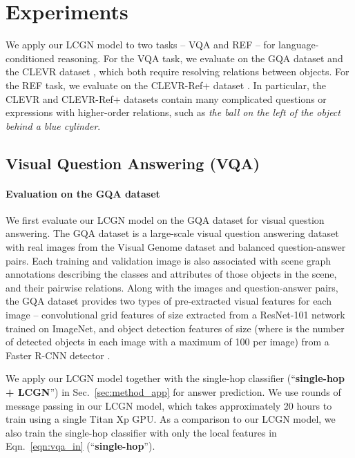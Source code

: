 \documentclass[10pt,twocolumn,letterpaper]{article}
\begin{document}
 \section{Experiments}
\label{sec:exp}

We apply our LCGN model to two tasks -- VQA and REF -- for language-conditioned reasoning. For the VQA task, we evaluate on the GQA dataset \cite{hudson2019gqa} and the CLEVR dataset \cite{johnson2017clevr}, which both require resolving relations between objects. For the REF task, we evaluate on the CLEVR-Ref+ dataset \cite{liu2019clevr}. In particular, the CLEVR and CLEVR-Ref+ datasets contain many complicated questions or expressions with higher-order relations, such as \textit{the ball on the left of the object behind a blue cylinder}.

\subsection{Visual Question Answering (VQA)}
\label{sec:exp_vqa}

\paragraph{Evaluation on the GQA dataset}
We first evaluate our LCGN model on the GQA dataset \cite{hudson2019gqa} for visual question answering. The GQA dataset is a large-scale visual question answering dataset with real images from the Visual Genome dataset \cite{krishna2017visual} and balanced question-answer pairs. Each training and validation image is also associated with scene graph annotations describing the classes and attributes of those objects in the scene, and their pairwise relations. Along with the images and question-answer pairs, the GQA dataset provides two types of pre-extracted visual features for each image -- convolutional grid features of size  extracted from a ResNet-101 network \cite{he2016deep} trained on ImageNet, and object detection features of size  (where  is the number of detected objects in each image with a maximum of 100 per image) from a Faster R-CNN detector \cite{ren2015faster}. 

We apply our LCGN model together with the single-hop classifier (``\textbf{single-hop + LCGN}'') in Sec.~\ref{sec:method_app} for answer prediction. We use  rounds of message passing in our LCGN model, which takes approximately 20 hours to train using a single Titan Xp GPU. As a comparison to our LCGN model, we also train the single-hop classifier with only the local features  in Eqn.~\ref{eqn:vqa_in} (``\textbf{single-hop}''). 
\end{document}

